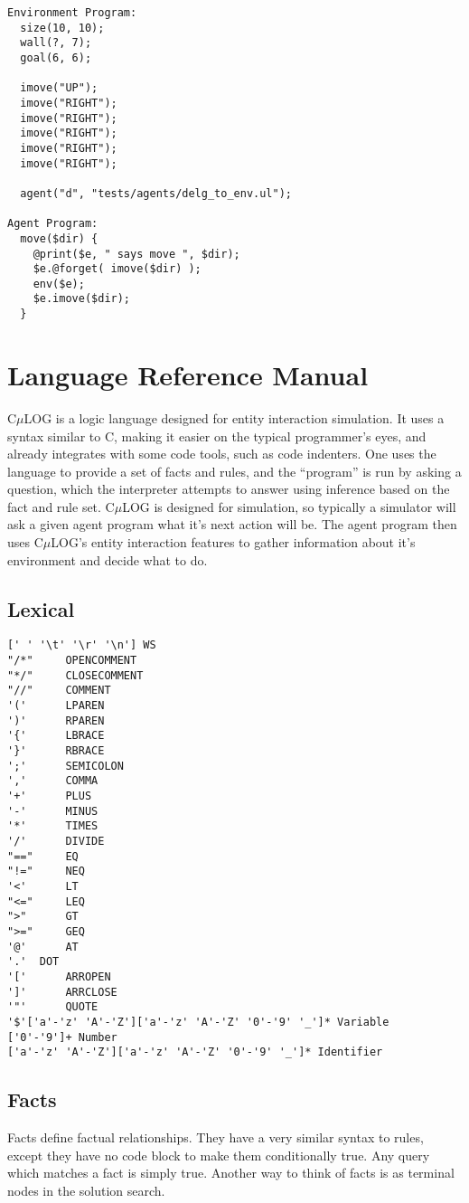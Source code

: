 \documentclass[onecolumn,titlepage]{article}
\begin{document}
\begin{verbatim}
Environment Program:
  size(10, 10);
  wall(?, 7);
  goal(6, 6);

  imove("UP");
  imove("RIGHT");
  imove("RIGHT");
  imove("RIGHT");
  imove("RIGHT");
  imove("RIGHT");

  agent("d", "tests/agents/delg_to_env.ul");

Agent Program:
  move($dir) {
    @print($e, " says move ", $dir);
    $e.@forget( imove($dir) );
    env($e);
    $e.imove($dir);
  }
\end{verbatim}


\section{Language Reference Manual}

C$\mu$LOG is a logic language designed for entity interaction
simulation.  It uses a syntax similar to C, making it easier on the
typical programmer's eyes, and already integrates with some code
tools, such as code indenters.  One uses the language to provide a set
of facts and rules, and the ``program'' is run by asking a question,
which the interpreter attempts to answer using inference based on the
fact and rule set.  C$\mu$LOG is designed for simulation, so typically
a simulator will ask a given agent program what it's next action will
be.  The agent program then uses C$\mu$LOG's entity interaction
features to gather information about it's environment and decide what
to do.

\subsection{Lexical}
\begin{verbatim}
[' ' '\t' '\r' '\n'] WS
"/*"     OPENCOMMENT
"*/"     CLOSECOMMENT
"//"     COMMENT
'('      LPAREN
')'      RPAREN
'{'      LBRACE
'}'      RBRACE
';'      SEMICOLON
','      COMMA
'+'      PLUS
'-'      MINUS
'*'      TIMES
'/'      DIVIDE
"=="     EQ
"!="     NEQ
'<'      LT
"<="     LEQ
">"      GT
">="     GEQ
'@'      AT
'.'	 DOT
'['      ARROPEN
']'      ARRCLOSE
'"'      QUOTE
'$'['a'-'z' 'A'-'Z']['a'-'z' 'A'-'Z' '0'-'9' '_']* Variable
['0'-'9']+ Number
['a'-'z' 'A'-'Z']['a'-'z' 'A'-'Z' '0'-'9' '_']* Identifier
\end{verbatim}

\subsection{Facts}
Facts define factual relationships.  They have a very similar syntax to rules, except they
have no code block to make them conditionally true.  Any query which matches a fact is simply
true. Another way to think of facts is as terminal nodes in the solution search.
\end{document}
